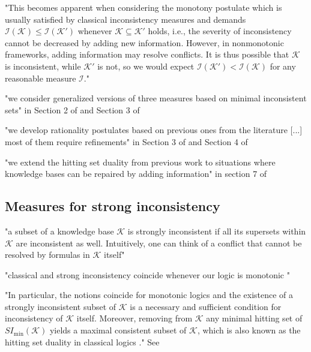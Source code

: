 "This becomes apparent when considering the monotony postulate which is usually satisfied by classical inconsistency measures and demands \(\mathcal{I}(\mathcal{K}) \leq \mathcal{I}(\mathcal{K}')\) whenever \(\mathcal{K} \subseteq \mathcal{K}'\) holds, i.e., the severity of inconsistency cannot be decreased by adding new information. However, in nonmonotonic frameworks, adding information may resolve conflicts. It is thus possible that \(\mathcal{K}\) is inconsistent, while \(\mathcal{K}'\) is not, so we would expect \(\mathcal{I}(\mathcal{K}') < \mathcal{I}(\mathcal{K})\) for any reasonable measure \(\mathcal{I}\)."

"we consider generalized versions of three measures based on minimal inconsistent sets" in Section 2 of \cite{ulbricht_measuring_2018} and Section 3 of \cite{ulbricht_handling_2020}

"we develop rationality postulates based on previous ones from the literature [...] most of them require refinements" in Section 3 of \cite{ulbricht_measuring_2018} and Section 4 of \cite{ulbricht_handling_2020}

"we extend the hitting set duality from previous work \cite{brewka_strong_2019} to situations where knowledge bases can be repaired by adding information" in section 7 of \cite{ulbricht_handling_2020}

\subsection{Measures for strong inconsistency}
\cite{ulbricht_handling_2020}

"a subset of a knowledge base \(\mathcal{K}\) is strongly inconsistent if all its supersets within \(\mathcal{K}\) are inconsistent as well. Intuitively, one can think of a conflict that cannot be resolved by formulas in \(\mathcal{K}\) itself"

"classical and strong inconsistency coincide whenever our logic is monotonic \cite{brewka_strong_2019}"

"In particular, the notions coincide for monotonic logics and the existence of a strongly inconsistent subset of \(\mathcal{K}\) is a necessary and sufficient condition for inconsistency of \(\mathcal{K}\) itself. Moreover, removing from \(\mathcal{K}\) any minimal hitting set of \(SI_{\min}(\mathcal{K})\) yields a maximal consistent subset of \(\mathcal{K}\), which is also known as the hitting set duality in classical logics \cite{reiter_theory_1987}." See \cite{brewka_strong_2017}


